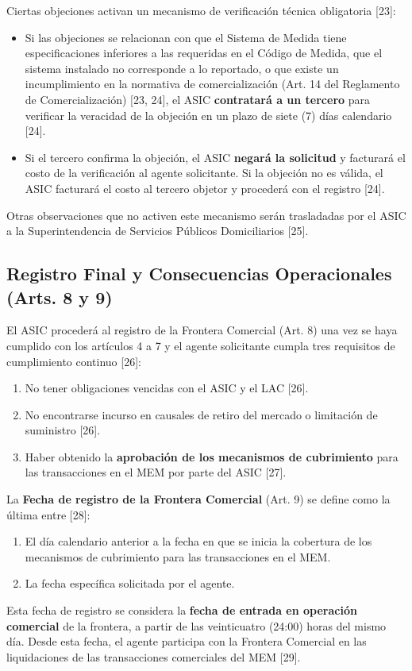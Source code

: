 \documentclass[a5paper]{book}%
\begin{document}
  Ciertas objeciones activan un mecanismo de verificación técnica obligatoria [23]:
  
  \begin{itemize}
  	\item Si las objeciones se relacionan con que el Sistema de Medida tiene especificaciones inferiores a las requeridas en el Código de Medida, que el sistema instalado no corresponde a lo reportado, o que existe un incumplimiento en la normativa de comercialización (Art. 14 del Reglamento de Comercialización) [23, 24], el ASIC \textbf{contratará a un tercero} para verificar la veracidad de la objeción en un plazo de siete (7) días calendario [24].
  	\item Si el tercero confirma la objeción, el ASIC \textbf{negará la solicitud} y facturará el costo de la verificación al agente solicitante. Si la objeción no es válida, el ASIC facturará el costo al tercero objetor y procederá con el registro [24].
  \end{itemize}
  Otras observaciones que no activen este mecanismo serán trasladadas por el ASIC a la Superintendencia de Servicios Públicos Domiciliarios [25].
  
  \subsection{Registro Final y Consecuencias Operacionales (Arts. 8\textdegree{} y 9\textdegree)}
  
  El ASIC procederá al registro de la Frontera Comercial (Art. 8\textdegree) una vez se haya cumplido con los artículos 4\textdegree{} a 7\textdegree{} y el agente solicitante cumpla tres requisitos de cumplimiento continuo [26]:
  \begin{enumerate}
  	\item No tener obligaciones vencidas con el ASIC y el LAC [26].
  	\item No encontrarse incurso en causales de retiro del mercado o limitación de suministro [26].
  	\item Haber obtenido la \textbf{aprobación de los mecanismos de cubrimiento} para las transacciones en el MEM por parte del ASIC [27].
  \end{enumerate}
  
  La \textbf{Fecha de registro de la Frontera Comercial} (Art. 9\textdegree) se define como la última entre [28]:
  \begin{enumerate}
  	\item El día calendario anterior a la fecha en que se inicia la cobertura de los mecanismos de cubrimiento para las transacciones en el MEM.
  	\item La fecha específica solicitada por el agente.
  \end{enumerate}
  Esta fecha de registro se considera la \textbf{fecha de entrada en operación comercial} de la frontera, a partir de las veinticuatro (24:00) horas del mismo día. Desde esta fecha, el agente participa con la Frontera Comercial en las liquidaciones de las transacciones comerciales del MEM [29].
  
\end{document}

